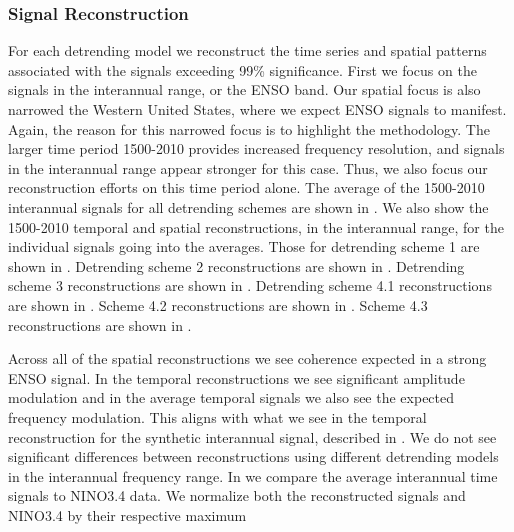 \documentclass[phd,tocprelim]{cornell}
\begin{document}
\subsubsection{Signal Reconstruction}
For each detrending model we reconstruct the time series and spatial 
patterns associated with the signals exceeding 99\% significance. 
First we focus on the signals in the interannual range, or the ENSO band. 
Our spatial focus is also narrowed the Western United States, where we 
expect ENSO signals to manifest. Again, the reason for this narrowed 
focus is to highlight the methodology. The larger time period 1500-2010 
provides increased frequency resolution, and signals in the interannual 
range appear stronger for this case. Thus, we also focus our reconstruction 
efforts on this time period alone. The average of the 1500-2010 interannual 
signals for all detrending schemes are shown in 
. 
We also show the 1500-2010 temporal and spatial reconstructions, in the 
interannual range, for the individual signals going into the averages. 
Those for detrending scheme 1 are shown in 
. 
Detrending scheme 2 reconstructions are shown in 
.
Detrending scheme 3 reconstructions are shown in 
.
Detrending scheme 4.1 reconstructions are shown in 
.
Scheme 4.2 reconstructions are shown in 
.
Scheme 4.3 reconstructions are shown in 
.
\par
Across all of the spatial reconstructions we see coherence expected in a 
strong ENSO signal. In the temporal reconstructions we see significant 
amplitude modulation and in the average temporal signals we also see the 
expected frequency modulation. This aligns with what we see in the temporal 
reconstruction for the synthetic interannual signal, described in 
. We do not see significant differences between 
reconstructions using different detrending models in the interannual 
frequency range. In  we 
compare the average interannual time signals to NINO3.4 data. We normalize 
both the reconstructed signals and NINO3.4 by their respective maximum 
\end{document}

